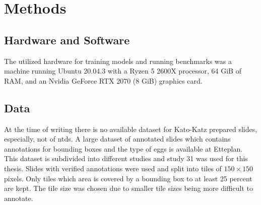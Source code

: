 \chapter{Methods}
\label{ch:Methods}


\section{Hardware and Software}
\label{sec:Methods:Hardware}

The utilized hardware for training models and running benchmarks was a machine running Ubuntu 20.04.3 with a Ryzen 5 2600X processor, 64 GiB of RAM, and an Nvidia GeForce RTX 2070 (8 GiB) graphics card.


\section{Data}
\label{sec:Methods:Data}

At the time of writing there is no available dataset for Kato-Katz prepared slides, especially, not of \acp{ntd}. A large dataset of annotated slides which contains annotations for bounding boxes and the type of eggs is available at Etteplan. This dataset is subdivided into different studies and study 31 was used for this thesis.  Slides with verified annotations were used and split into tiles of $150 \times 150$ pixels. Only tiles which area is covered by a bounding box to at least 25 percent are kept.  The tile size was chosen due to smaller tile sizes being more difficult to annotate.


